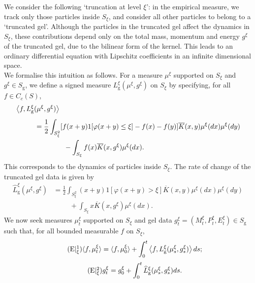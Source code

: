 \documentclass[11pt, notitlepage]{article}
\begin{document}
We consider the following `truncation at level $\xi$': in the empirical measure, we track only those particles inside $S_\xi$, and consider all other particles to belong to a `truncated gel'. Although the particles in the truncated gel affect the dynamics in $S_\xi$, these contributions depend only on the total mass, momentum and energy $g^\xi$ of the truncated gel, due to the bilinear form of the kernel. This leads to an ordinary differential equation with Lipschitz coefficients in an infinite dimensional space. \medskip \\ We formalise this intuition as follows.  For a measure $\mu^\xi$ supported on $S_\xi$ and $g^\xi\in S_\mathrm{g}$, we define a signed measure $L^\xi_\mathrm{g}(\mu^\xi, g^\xi)$ on $S_\xi$ by specifying, for all $f\in C_c(S)$, \begin{equation}\begin{split}\label{eq: truncated drift 1} &\left\langle f, L^\xi_\mathrm{g}(\mu^\xi, g^\xi)\right\rangle \\[1ex] &\hspace{1cm}=\frac{1}{2}\int_{S_\xi^2}[f(x+y)1[\varphi(x+y)\le \xi]-f(x)-f(y)]\overline{K}(x,y)\mu^\xi(dx)\mu^\xi(dy)\\& \hspace{2.5cm}-\int_{S_\xi}f(x)\overline{K}(x,g^\xi)\mu^\xi(dx). \end{split}\end{equation} This corresponds to the dynamics of particles inside $S_\xi$. The rate of change of the truncated gel data is given by \begin{equation} \begin{split}\label{eq: truncated drift 2} \widehat{L}^\xi_\mathrm{g}(\mu^\xi,g^\xi)&=\frac{1}{2}\int_{S_\xi^2} (x+y)1[\varphi(x+y)> \xi]\overline{K}(x,y)\mu^\xi(dx)\mu^\xi(dy) \\ &\hspace{1cm}+\int_{S_\xi}x\overline{K}(x,g^\xi)\mu^\xi(dx).\end{split}\end{equation}We now seek measures $\mu^\xi_t$ supported on $S_\xi$ and gel data $g^\xi_t=(M^\xi_t, P^\xi_t, E^\xi_t)\in S_\mathrm{g}$ such that, for all bounded measurable $f$ on $S_\xi$, \begin{equation} \tag{E$|^1_\mathrm{\xi}$} \label{eq:rE1}  \langle f, \mu^\xi_t\rangle = \langle f, \mu^\xi_0\rangle +\int_0^t\left\langle f, L^\xi_\mathrm{g}(\mu^\xi_s, g^\xi_s)\right\rangle ds;\end{equation}
\begin{equation} \label{eq: rE2} \tag{E$|^2_\mathrm{\xi}$}
g^\xi_t=g^\xi_0+\int_0^t\widehat{L}^\xi_\mathrm{g}(\mu^{\xi}_s,g^\xi_s)ds.
\end{equation} 
\end{document}
